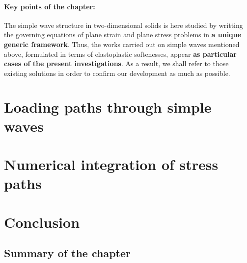 \paragraph*{Key points of the chapter:} The simple wave structure in two-dimensional solids is here studied by writting the governing equations of plane strain and plane stress problems in \textbf{a unique generic framework}.
Thus, the works carried out on simple waves mentioned above, formulated in terms of elastoplastic softenesses, appear \textbf{as particular cases of the present investigations}.
As a result, we shall refer to those existing solutions in order to confirm our development as much as possible.

\label{sec:charac_plast}


\section{Loading paths through simple waves}
\label{sec:stress_paths}



\section{Numerical integration of stress paths}
\label{sec:stress_paths_num}


% 


\section{Conclusion}

\subsection{Summary of the chapter}

